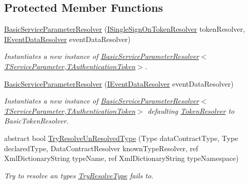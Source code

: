 \subsection*{Protected Member Functions}
\begin{DoxyCompactItemize}
\item 
\hyperlink{classCqrs_1_1Services_1_1BasicServiceParameterResolver_af82f43a2f64aa5c33a3692a2a689367b_af82f43a2f64aa5c33a3692a2a689367b}{Basic\+Service\+Parameter\+Resolver} (\hyperlink{interfaceCqrs_1_1Services_1_1ISingleSignOnTokenResolver}{I\+Single\+Sign\+On\+Token\+Resolver} token\+Resolver, \hyperlink{interfaceCqrs_1_1Services_1_1IEventDataResolver}{I\+Event\+Data\+Resolver} event\+Data\+Resolver)
\begin{DoxyCompactList}\small\item\em Instantiates a new instance of \hyperlink{classCqrs_1_1Services_1_1BasicServiceParameterResolver_af82f43a2f64aa5c33a3692a2a689367b_af82f43a2f64aa5c33a3692a2a689367b}{Basic\+Service\+Parameter\+Resolver$<$\+T\+Service\+Parameter,\+T\+Authentication\+Token$>$}. \end{DoxyCompactList}\item 
\hyperlink{classCqrs_1_1Services_1_1BasicServiceParameterResolver_a74e001363a0226b4fbf5d3796e1230a9_a74e001363a0226b4fbf5d3796e1230a9}{Basic\+Service\+Parameter\+Resolver} (\hyperlink{interfaceCqrs_1_1Services_1_1IEventDataResolver}{I\+Event\+Data\+Resolver} event\+Data\+Resolver)
\begin{DoxyCompactList}\small\item\em Instantiates a new instance of \hyperlink{classCqrs_1_1Services_1_1BasicServiceParameterResolver_af82f43a2f64aa5c33a3692a2a689367b_af82f43a2f64aa5c33a3692a2a689367b}{Basic\+Service\+Parameter\+Resolver$<$\+T\+Service\+Parameter,\+T\+Authentication\+Token$>$} defaulting \hyperlink{classCqrs_1_1Services_1_1BasicServiceParameterResolver_a0ed208048d0f925dfa1e14fb73d82f0b_a0ed208048d0f925dfa1e14fb73d82f0b}{Token\+Resolver} to Basic\+Token\+Resolver. \end{DoxyCompactList}\item 
abstract bool \hyperlink{classCqrs_1_1Services_1_1BasicServiceParameterResolver_ab1de06b3744da74df0708545666c9f6f_ab1de06b3744da74df0708545666c9f6f}{Try\+Resolve\+Un\+Resolved\+Type} (Type data\+Contract\+Type, Type declared\+Type, Data\+Contract\+Resolver known\+Type\+Resolver, ref Xml\+Dictionary\+String type\+Name, ref Xml\+Dictionary\+String type\+Namespace)
\begin{DoxyCompactList}\small\item\em Try to resolve an types \hyperlink{classCqrs_1_1Services_1_1BasicServiceParameterResolver_adbc4b10f8931db30768d7ca84bdb0260_adbc4b10f8931db30768d7ca84bdb0260}{Try\+Resolve\+Type} fails to. \end{DoxyCompactList}\item 

\end{DoxyCompactItemize}

